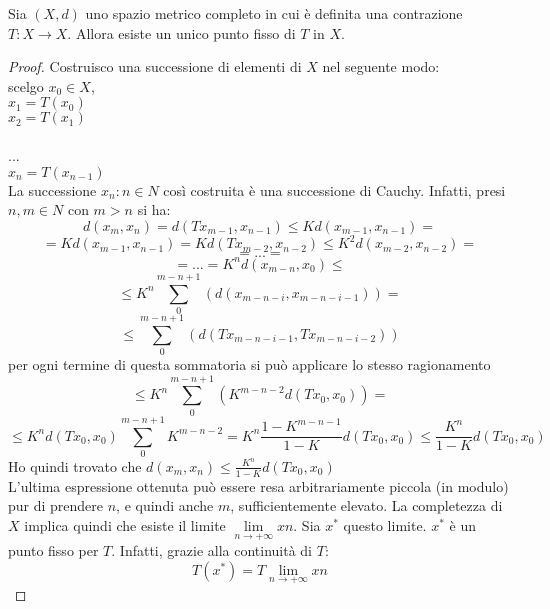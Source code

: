 \theorem
Sia $(X, d)$ uno spazio metrico completo in cui è definita una contrazione
$T: X \rightarrow X$. Allora esiste un unico punto fisso di $T$ in $X$.
\begin{proof}
	Costruisco una successione di elementi di $X$ nel seguente modo:\\
	scelgo $x_0\in X$,\\
	$x_1 = T(x_0)$\\
	$x_2 = T(x_1)$\\\\
	...\\
	$x_n = T(x_{n-1})$\\
	La successione ${x_n: n \in N }$ così costruita è una successione di Cauchy. Infatti, presi $n, m \in N$ con $m > n$ si ha:
	$$d(x_{m},x_{n}) = d(Tx_{m-1},x_{n-1}) \le Kd(x_{m-1},x_{n-1})=$$
	$$=Kd(x_{m-1},x_{n-1}) = Kd(Tx_{m-2},x_{n-2}) \le K^2d(x_{m-2},x_{n-2})=$$
	$$=...=$$
	$$=...=K^nd(x_{m-n},x_{0})\le$$
	$$\le K^{n}\sum\limits_0^{m-n+1}(d(x_{m-n-i},x_{m-n-i-1}))=$$
	$$\le \sum\limits_0^{m-n+1}(d(Tx_{m-n-i-1},Tx_{m-n-i-2}))$$
	per ogni termine di questa sommatoria si può applicare lo stesso ragionamento
	$$\le K^{n}\sum\limits_0^{m-n+1}(K^{m-n-2}d(Tx_{0},x_{0}))=$$
	$$\le K^{n}d(Tx_{0},x_{0})\sum\limits_0^{m-n+1}K^{m-n-2}=K^n\frac{1-K^{m-n-1}}{1-K}d(Tx_{0},x_{0}) \le \frac{K^n}{1-K}d(Tx_{0},x_{0})$$
	Ho quindi trovato che $d(x_{m},x_{n})\le\frac{K^n}{1-K}d(Tx_{0},x_{0})$\\
	L’ultima espressione ottenuta può essere resa arbitrariamente piccola (in modulo) pur di
	prendere $n$, e quindi anche $m$, sufficientemente elevato. La completezza di $X$ implica quindi
	che esiste il limite $\lim\limits_{n\rightarrow +\infty}xn$. Sia $x^*$ questo limite. $x^*$ è un punto fisso per $T$. Infatti, grazie
	alla continuità di $T$:
	$$T(x^*)=T{\lim\limits_{n\rightarrow +\infty}xn}$$

	
	
	
	
\end{proof} 


